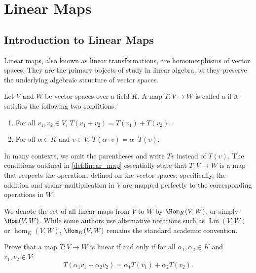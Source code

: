 \renewcommand{\thetheorem}{\arabic{chapter}.\alph{section}.\arabic{theorem}}

\setcounter{chapter}{14} %
\chapter{Linear Maps}

\section{Introduction to Linear Maps}

Linear maps, also known as linear transformations, are homomorphisms of vector spaces. They are the primary objects of study in linear algebra, as they preserve the underlying algebraic structure of vector spaces.

\begin{definition}
\label{def:linear_map}
Let $V$ and $W$ be vector spaces over a field $K$. A map $T: V \to W$ is called a  if it satisfies the following two conditions:
\begin{enumerate}
    \item For all $v_1, v_2 \in V$, $T(v_1 + v_2) = T(v_1) + T(v_2)$.
    \item For all $\alpha \in K$ and $v \in V$, $T(\alpha \cdot v) = \alpha \cdot T(v)$.
\end{enumerate}
\end{definition}

\begin{remark}
\label{rem:linear_map_notation}
In many contexts, we omit the parentheses and write $Tv$ instead of $T(v)$. The conditions outlined in \cref{def:linear_map} essentially state that $T: V \to W$ is a map that respects the operations defined on the vector spaces; specifically, the addition and scalar multiplication in $V$ are mapped perfectly to the corresponding operations in $W$.

We denote the set of all linear maps from $V$ to $W$ by $\Hom_K(V, W)$, or simply $\Hom(V, W)$. While some authors use alternative notations such as $\operatorname{Lin}(V, W)$ or $\hom_K(V, W)$, $\Hom_K(V, W)$ remains the standard academic convention.
\end{remark}

\begin{exercise}
\label{exer:linearity_criterion}
Prove that a map $T: V \to W$ is linear if and only if for all $\alpha_1, \alpha_2 \in K$ and $v_1, v_2 \in V$:
\[
T(\alpha_1 v_1 + \alpha_2 v_2) = \alpha_1 T(v_1) + \alpha_2 T(v_2).
\]
\end{exercise}

